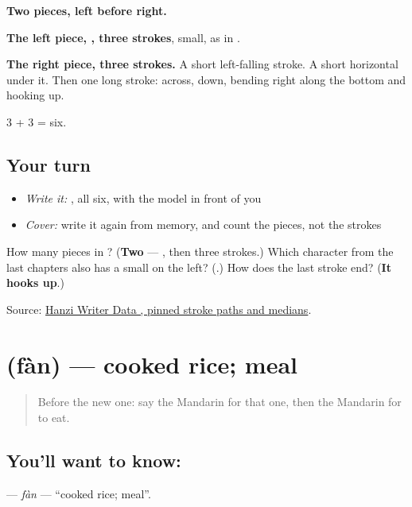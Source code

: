 \begin{quote}
\end{quote}

\textbf{Two pieces, left before right.}

\textbf{The left piece, , three strokes}, small, as in .

\textbf{The right piece, three strokes.} A short left-falling stroke. A short horizontal under it. Then one long stroke: across, down, bending right along the bottom and hooking up.

3 + 3 = six.

\subsection*{Your turn}
\begin{itemize}
\raggedright
  \item \emph{Write it:} , all six, with the model in front of you
  \item \emph{Cover:} write it again from memory, and count the pieces, not the strokes
\end{itemize}

\begin{tcolorbox}[breakable,colback=teal!4,colframe=teal!35!black,title={Before you move on}]
How many pieces in ? (\textbf{Two} — , then three strokes.) Which character from the last chapters also has a small  on the left? (\textbf{}.) How does the last stroke end? (\textbf{It hooks up}.)

Source: \href{https://raw.githubusercontent.com/chanind/hanzi-writer-data/68d10a4b21150cae5e1ebbd223eed289cf32d90c/data/\%E5\%90\%83.json}{Hanzi Writer Data , pinned stroke paths and medians}.
\end{tcolorbox}
\section[\texorpdfstring{\zh{饭} (fàn)}{饭 (fàn)}]{ (fàn) — cooked rice; meal}

\label{lesson:ZH-C38-fan}



\begin{quote}
Before the new one: say the Mandarin for that one, then the Mandarin for to eat.
\end{quote}

\subsection*{You'll want to know: }
\textbf{} — \emph{fàn} — \textquotedblleft{}cooked rice; meal\textquotedblright{}.

